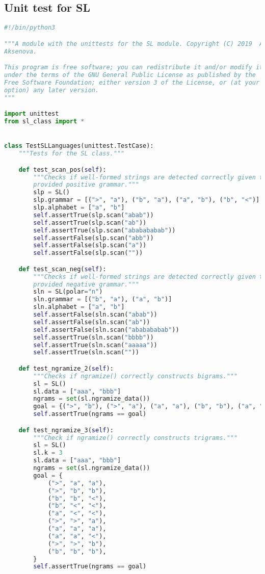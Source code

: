\subsection*{Unit test for SL}

\begin{lstlisting}[language=Python]
#!/bin/python3

"""A module with the unittests for the SL module. Copyright (C) 2019  Alena
Aksenova.

This program is free software; you can redistribute it and/or modify it
under the terms of the GNU General Public License as published by the
Free Software Foundation; either version 3 of the License, or (at your
option) any later version.
"""

import unittest
from sl_class import *


class TestSLLanguages(unittest.TestCase):
    """Tests for the SL class."""

    def test_scan_pos(self):
        """Checks if well-formed strings are detected correctly given the
        provided positive grammar."""
        slp = SL()
        slp.grammar = [(">", "a"), ("b", "a"), ("a", "b"), ("b", "<")]
        slp.alphabet = ["a", "b"]
        self.assertTrue(slp.scan("abab"))
        self.assertTrue(slp.scan("ab"))
        self.assertTrue(slp.scan("ababababab"))
        self.assertFalse(slp.scan("abb"))
        self.assertFalse(slp.scan("a"))
        self.assertFalse(slp.scan(""))

    def test_scan_neg(self):
        """Checks if well-formed strings are detected correctly given the
        provided negative grammar."""
        sln = SL(polar="n")
        sln.grammar = [("b", "a"), ("a", "b")]
        sln.alphabet = ["a", "b"]
        self.assertFalse(sln.scan("abab"))
        self.assertFalse(sln.scan("ab"))
        self.assertFalse(sln.scan("ababababab"))
        self.assertTrue(sln.scan("bbbb"))
        self.assertTrue(sln.scan("aaaaa"))
        self.assertTrue(sln.scan(""))

    def test_ngramize_2(self):
        """Checks if ngramize() correctly constructs bigrams."""
        sl = SL()
        sl.data = ["aaa", "bbb"]
        ngrams = set(sl.ngramize_data())
        goal = {(">", "b"), (">", "a"), ("a", "a"), ("b", "b"), ("a", "<"), ("b", "<")}
        self.assertTrue(ngrams == goal)

    def test_ngramize_3(self):
        """Check if ngramize() correctly constructs trigrams."""
        sl = SL()
        sl.k = 3
        sl.data = ["aaa", "bbb"]
        ngrams = set(sl.ngramize_data())
        goal = {
            (">", "a", "a"),
            (">", "b", "b"),
            ("b", "b", "<"),
            ("b", "<", "<"),
            ("a", "<", "<"),
            (">", ">", "a"),
            ("a", "a", "a"),
            ("a", "a", "<"),
            (">", ">", "b"),
            ("b", "b", "b"),
        }
        self.assertTrue(ngrams == goal)


\end{lstlisting}
